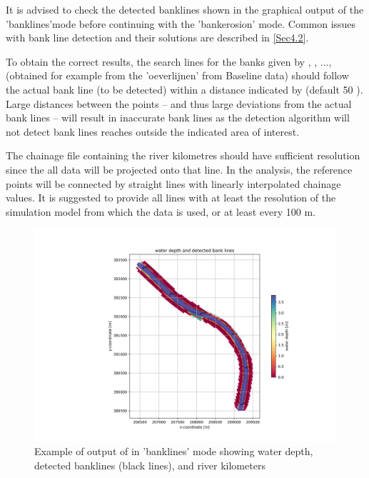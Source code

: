 \Note It is advised to check the detected banklines shown in the graphical output of the 'banklines'mode before continuing with the 'bankerosion' mode. Common issues with bank line detection and their solutions are described in \autoref{Sec4.2}.

\Note To obtain the correct results, the search lines for the banks given by , , ...,  (obtained for example from the 'oeverlijnen' from Baseline data) should follow the actual bank line (to be detected) within a distance indicated by  (default 50 ).
Large distances between the points -- and thus large deviations from the actual bank lines -- will result in inaccurate bank lines as the detection algorithm will not detect bank lines reaches outside the indicated area of interest.

\Note The chainage file containing the river kilometres should have sufficient resolution since the all data will be projected onto that line.
In the analysis, the reference points will be connected by straight lines with linearly interpolated chainage values.
It is suggested to provide all lines with at least the resolution of the simulation model from which the data is used, or at least every 100 m.


\begin{figure}[!t]
\vspace*{-1cm} 
\includegraphics[width=\textwidth]{figures/1_banklinedetection.png}
\vspace*{-1cm} 
\caption{Example of output of \dfastbe in 'banklines' mode showing water depth, detected banklines (black lines), and river kilometers}
\label{Fig2.2}
\end{figure}

